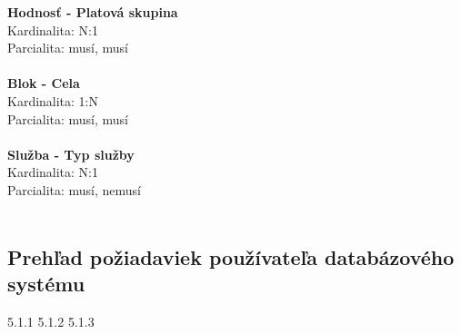 			\textbf{Hodnosť - Platová skupina} \\
				Kardinalita: N:1\\
				Parcialita: musí, musí\\ \\
			\textbf{Blok - Cela} \\
				Kardinalita: 1:N\\
				Parcialita: musí, musí\\ \\
			\textbf{Služba - Typ služby} \\
				Kardinalita: N:1\\
				Parcialita: musí, nemusí\\ \\

		\subsection{Prehľad požiadaviek používateľa databázového systému}

		5.1.1 
		5.1.2
		5.1.3